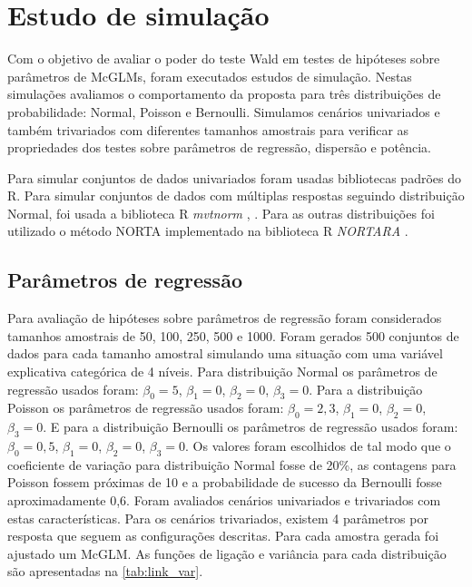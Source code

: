 \chapter{Estudo de simulação}


Com o objetivo de avaliar o poder do teste Wald em testes de hipóteses sobre parâmetros de McGLMs, foram executados estudos de simulação. Nestas simulações avaliamos o comportamento da proposta para três distribuições de probabilidade: Normal, Poisson e Bernoulli. Simulamos cenários univariados e também trivariados com diferentes tamanhos amostrais para verificar as propriedades dos testes sobre parâmetros de regressão, dispersão e potência.

Para simular conjuntos de dados univariados foram usadas bibliotecas padrões do R. Para simular conjuntos de dados com múltiplas respostas seguindo distribuição Normal, foi usada a biblioteca R \emph{mvtnorm} \citep{mvtnorm1}, \citep{mvtnorm2}. Para as outras distribuições foi utilizado o método NORTA \citep{cario1997modeling} implementado na biblioteca R \emph{NORTARA} \citep{nortara}.

\section{Parâmetros de regressão}

Para avaliação de hipóteses sobre parâmetros de regressão foram considerados tamanhos amostrais de 50, 100, 250, 500 e 1000. Foram gerados 500 conjuntos de dados para cada tamanho amostral simulando uma situação com uma variável explicativa categórica de 4 níveis. Para distribuição Normal os parâmetros de regressão usados foram: $\beta_0 = 5$, $\beta_1 = 0$, $\beta_2 = 0$, $\beta_3 = 0$. Para a distribuição Poisson os parâmetros de regressão usados foram: $\beta_0 = 2,3$, $\beta_1 = 0$, $\beta_2 = 0$, $\beta_3 = 0$. E para a distribuição Bernoulli os parâmetros de regressão usados foram: $\beta_0 = 0,5$, $\beta_1 = 0$, $\beta_2 = 0$, $\beta_3 = 0$. Os valores foram escolhidos de tal modo que o coeficiente de variação para distribuição Normal fosse de 20\%, as contagens para Poisson fossem próximas de 10 e a probabilidade de sucesso da Bernoulli fosse aproximadamente 0,6. Foram avaliados cenários univariados e trivariados com estas características. Para os cenários trivariados, existem 4 parâmetros por resposta que seguem as configurações descritas. Para cada amostra gerada foi ajustado um McGLM. As funções de ligação e variância para cada distribuição são apresentadas na \autoref{tab:link_var}. 

